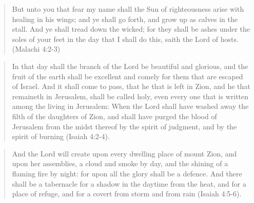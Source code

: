\begin{quotation}
But unto you that fear my name shall the Sun of righteousness arise with healing in his wings; and ye shall go forth, and grow up as calves in the stall. And ye shall tread down the wicked; for they shall be ashes under the soles of your feet in the day that I shall do this, saith the Lord of hosts. (Malachi 4:2-3)
\end{quotation}

\begin{quotation}
In that day shall the branch of the Lord be beautiful and glorious, and the fruit of the earth shall be excellent and comely for them that are escaped of Israel. And it shall come to pass, that he that is left in Zion, and he that remaineth in Jerusalem, shall be called holy, even every one that is written among the living in Jerusalem: When the Lord shall have washed away the filth of the daughters of Zion, and shall have purged the blood of Jerusalem from the midst thereof by the spirit of judgment, and by the spirit of burning (Isaiah 4:2-4).
\end{quotation}

\begin{quotation}
And the Lord will create upon every dwelling place of mount Zion, and upon her assemblies, a cloud and smoke by day, and the shining of a flaming fire by night: for upon all the glory shall be a defence. And there shall be a tabernacle for a shadow in the daytime from the heat, and for a place of refuge, and for a covert from storm and from rain (Isaiah 4:5-6).
\end{quotation}
